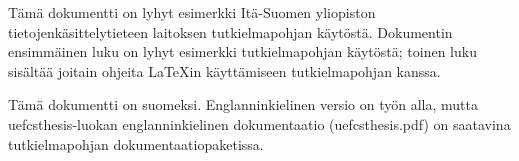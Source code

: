 Tämä dokumentti on lyhyt esimerkki Itä-Suomen yliopiston tietojenkäsittelytieteen laitoksen tutkielmapohjan käytöstä. Dokumentin ensimmäinen luku on lyhyt esimerkki tutkielmapohjan käytöstä; toinen luku sisältää joitain ohjeita \LaTeX{in} käyttämiseen tutkielmapohjan kanssa.

Tämä dokumentti on suomeksi. Englanninkielinen versio on työn alla, mutta uefcsthesis-luokan englanninkielinen dokumentaatio (uefcsthesis.pdf) on saatavina tutkielmapohjan dokumentaatiopaketissa.